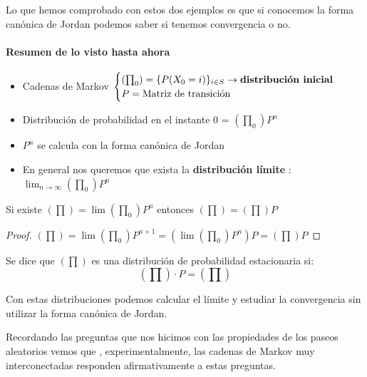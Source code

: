 Lo que hemos comprobado con estos dos ejemplos es que si conocemos la forma canónica de Jordan podemos saber si tenemos convergencia o no.

\paragraph{Resumen de lo visto hasta ahora}
\begin{itemize}
	\item Cadenas de Markov $\begin{cases}
	(\prod_0) = \{P(X_0 = i)\}_{i \in S} \rightarrow \text{\textbf{distribución inicial}}\\
	P = \text{Matriz de transición}
	\end{cases}$
	\item Distribución de probabilidad en el instante 0 = $(\prod_0)P^n$
	\item $P^n$ se calcula con la forma canónica de Jordan
	\item En general nos queremos que exista la \textbf{distribución límite} : $\lim_{n\rightarrow\infty} (\prod_0) P^n$
\end{itemize}

\obs Si existe $(\prod) = \lim (\prod_0) P^n$ entonces $(\prod) = (\prod) P$
\begin{proof}
	$(\prod) = \lim(\prod_0) P^{n+1} = (\lim (\prod_0)P^n)P = (\prod) P$
\end{proof}

\begin{defn}
	Se dice que $(\prod)$ es una distribución de probabilidad estacionaria si:
	$$(\prod)\cdot P = (\prod)$$	
\end{defn}

\obs Con estas distribuciones podemos calcular el límite y estudiar la convergencia sin utilizar la forma canónica de Jordan.


Recordando las preguntas que nos hicimos con las propiedades de los paseos aleatorios vemos que , experimentalmente, las cadenas de Markov muy interconectadas responden afirmativamente a estas preguntas.

